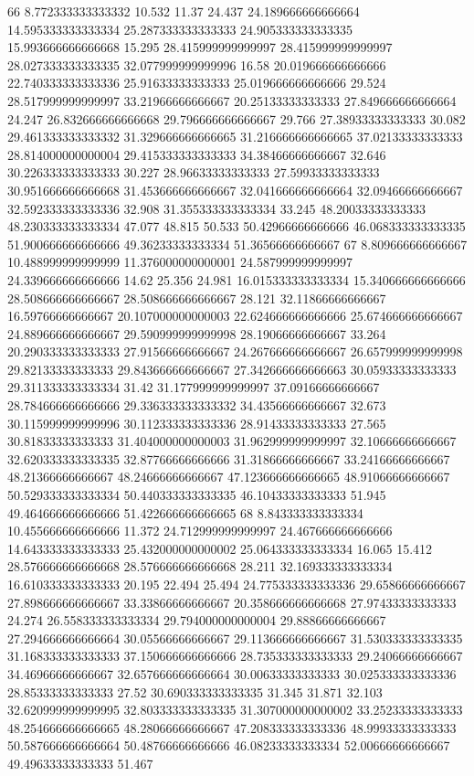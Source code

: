 66 8.772333333333332 10.532 11.37 24.437 24.189666666666664 14.595333333333334 25.287333333333333 24.905333333333335 15.993666666666668 15.295 28.415999999999997 28.415999999999997 28.027333333333335 32.077999999999996 16.58 20.019666666666666 22.740333333333336 25.91633333333333 25.019666666666666 29.524 28.517999999999997 33.21966666666667 20.25133333333333 27.849666666666664 24.247 26.832666666666668 29.796666666666667 29.766 27.38933333333333 30.082 29.461333333333332 31.329666666666665 31.216666666666665 37.02133333333333 28.814000000000004 29.415333333333333 34.38466666666667 32.646 30.226333333333333 30.227 28.96633333333333 27.59933333333333 30.951666666666668 31.453666666666667 32.041666666666664 32.09466666666667 32.592333333333336 32.908 31.355333333333334 33.245 48.20033333333333 48.230333333333334 47.077 48.815 50.533 50.42966666666666 46.068333333333335 51.900666666666666 49.36233333333334 51.36566666666667
67 8.809666666666667 10.488999999999999 11.376000000000001 24.587999999999997 24.339666666666666 14.62 25.356 24.981 16.015333333333334 15.340666666666666 28.508666666666667 28.508666666666667 28.121 32.11866666666667 16.59766666666667 20.107000000000003 22.624666666666666 25.674666666666667 24.889666666666667 29.590999999999998 28.19066666666667 33.264 20.290333333333333 27.91566666666667 24.267666666666667 26.657999999999998 29.82133333333333 29.843666666666667 27.342666666666663 30.05933333333333 29.311333333333334 31.42 31.177999999999997 37.09166666666667 28.784666666666666 29.336333333333332 34.43566666666667 32.673 30.115999999999996 30.112333333333336 28.91433333333333 27.565 30.81833333333333 31.404000000000003 31.962999999999997 32.10666666666667 32.620333333333335 32.87766666666666 31.31866666666667 33.24166666666667 48.21366666666667 48.24666666666667 47.123666666666665 48.91066666666667 50.529333333333334 50.440333333333335 46.10433333333333 51.945 49.464666666666666 51.422666666666665
68 8.843333333333334 10.455666666666666 11.372 24.712999999999997 24.467666666666666 14.643333333333333 25.432000000000002 25.064333333333334 16.065 15.412 28.576666666666668 28.576666666666668 28.211 32.169333333333334 16.610333333333333 20.195 22.494 25.494 24.775333333333336 29.65866666666667 27.898666666666667 33.33866666666667 20.358666666666668 27.97433333333333 24.274 26.558333333333334 29.794000000000004 29.88866666666667 27.294666666666664 30.05566666666667 29.113666666666667 31.530333333333335 31.168333333333333 37.150666666666666 28.735333333333333 29.24066666666667 34.46966666666667 32.657666666666664 30.00633333333333 30.025333333333336 28.85333333333333 27.52 30.690333333333335 31.345 31.871 32.103 32.620999999999995 32.803333333333335 31.307000000000002 33.25233333333333 48.254666666666665 48.28066666666667 47.208333333333336 48.99933333333333 50.587666666666664 50.48766666666666 46.08233333333334 52.00666666666667 49.49633333333333 51.467
